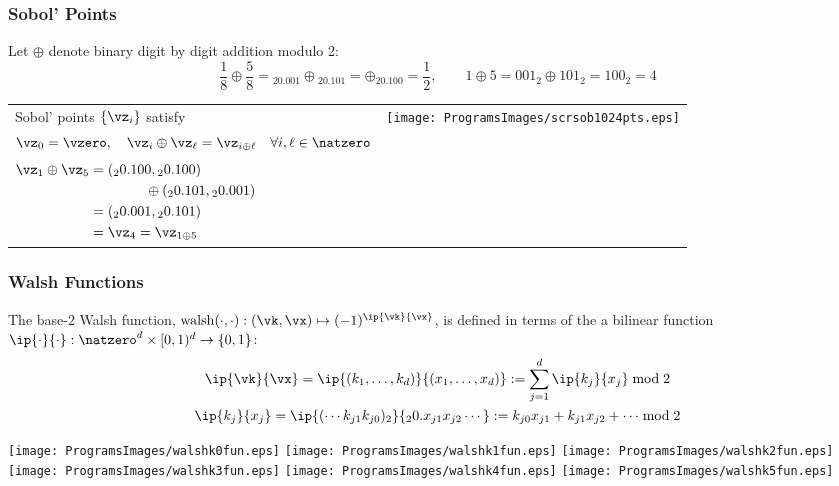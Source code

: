 \documentclass[10pt,compress]{beamer} %
\DeclareMathOperator{\walsh}{walsh}
\newcommand{\cube}{[0,1)^d}
\newcommand{\desall}{\{\vz_i\}}
\begin{document}
\begin{frame}\frametitle{Sobol' Points}
Let $\oplus$ denote binary \alert{digit by digit} addition modulo 2:
\begin{equation*}
\frac 18 \oplus \frac 58 = {}_20.001 \oplus {}_20.101 = \oplus {}_20.100 = \frac 12, \qquad
1 \oplus 5 = 001_2 \oplus 101_2 = 100_2 = 4
\end{equation*}
\begin{tabular}{m{5.7cm}>{\centering}m{5.7cm}}
Sobol' points $\desall$ satisfy
\begin{equation*}
\vz_0=\vzero, \quad \vz_i \oplus \vz_\ell = \vz_{i\oplus \ell} \quad \forall i,\ell \in \natzero
\end{equation*}
$\begin{aligned}
\vz_1\oplus\vz_5 &= ({}_20.100, {}_20.100) \\
& \qquad \qquad \oplus ({}_20.101, {}_20.001) \\
&= ({}_20.001, {}_20.101) \\
& = \vz_4=\vz_{1\oplus 5}
\end{aligned}$
&
\texttt{[image: ProgramsImages/scrsob1024pts.eps]}
\end{tabular}
\end{frame}

\begin{frame}\frametitle{Walsh Functions}
\vspace{-2ex}
The base-$2$ Walsh function, \alert{$\walsh(\cdot,\cdot) : (\vk,\vx) \mapsto (-1)^{\ip{\vk}{\vx}}$}, is defined in terms of the a bilinear function $\ip{\cdot}{\cdot}: \natzero^d \times \cube \to \{0,1\}$:
\vspace{-2ex}
\begin{gather*}
\ip{\vk}{\vx} = \ip{(k_1, \ldots, k_d) }{(x_1, \ldots, x_d)} := \sum_{j=1}^d \ip{k_j}{x_j} \bmod 2 \\
\ip{k_j}{x_j} = \ip{(\cdots k_{j1} k_{j0})_2}{{}_20.x_{j1} x_{j2} \cdots} := k_{j0} x_{j1} + k_{j1} x_{j2} + \cdots \bmod 2
\end{gather*}
\begin{center}
\texttt{[image: ProgramsImages/walshk0fun.eps]} \qquad
\texttt{[image: ProgramsImages/walshk1fun.eps]} \qquad
\texttt{[image: ProgramsImages/walshk2fun.eps]} \\
\texttt{[image: ProgramsImages/walshk3fun.eps]} \qquad
\texttt{[image: ProgramsImages/walshk4fun.eps]} \qquad
\texttt{[image: ProgramsImages/walshk5fun.eps]} 
\end{center}
\end{frame}
\end{document}
